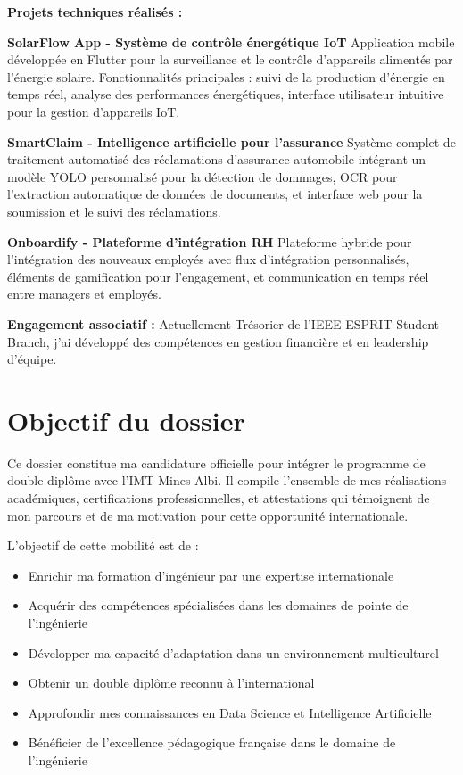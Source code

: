 \documentclass[12pt,a4paper]{report}
\begin{document}
\textbf{Projets techniques réalisés :}

\textbf{\large\textcolor{sectioncolor}{SolarFlow App - Système de contrôle énergétique IoT}}
Application mobile développée en Flutter pour la surveillance et le contrôle d'appareils alimentés par l'énergie solaire. Fonctionnalités principales : suivi de la production d'énergie en temps réel, analyse des performances énergétiques, interface utilisateur intuitive pour la gestion d'appareils IoT.

\textbf{\large\textcolor{sectioncolor}{SmartClaim - Intelligence artificielle pour l'assurance}}
Système complet de traitement automatisé des réclamations d'assurance automobile intégrant un modèle YOLO personnalisé pour la détection de dommages, OCR pour l'extraction automatique de données de documents, et interface web pour la soumission et le suivi des réclamations.

\textbf{\large\textcolor{sectioncolor}{Onboardify - Plateforme d'intégration RH}}
Plateforme hybride pour l'intégration des nouveaux employés avec flux d'intégration personnalisés, éléments de gamification pour l'engagement, et communication en temps réel entre managers et employés.

\textbf{Engagement associatif :}
Actuellement Trésorier de l'IEEE ESPRIT Student Branch, j'ai développé des compétences en gestion financière et en leadership d'équipe.

\section{Objectif du dossier}

Ce dossier constitue ma candidature officielle pour intégrer le programme de double diplôme avec l'IMT Mines Albi. Il compile l'ensemble de mes réalisations académiques, certifications professionnelles, et attestations qui témoignent de mon parcours et de ma motivation pour cette opportunité internationale.

L'objectif de cette mobilité est de :
\begin{itemize}
    \item Enrichir ma formation d'ingénieur par une expertise internationale
    \item Acquérir des compétences spécialisées dans les domaines de pointe de l'ingénierie
    \item Développer ma capacité d'adaptation dans un environnement multiculturel
    \item Obtenir un double diplôme reconnu à l'international
    \item Approfondir mes connaissances en Data Science et Intelligence Artificielle
    \item Bénéficier de l'excellence pédagogique française dans le domaine de l'ingénierie
\end{itemize}
\end{document}
